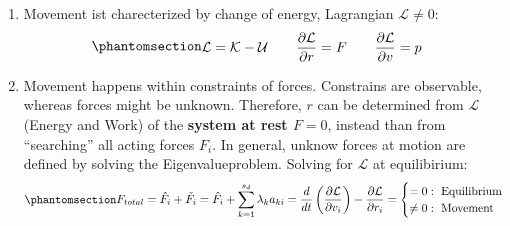 \documentclass[
  letterpaper,
  DIV=11,
  numbers=noendperiod]{scrartcl}
\begin{document}
\begin{enumerate}
\def\labelenumi{\arabic{enumi}.}
\item
  Movement ist charecterized by change of energy, Lagrangian
  \(\mathcal{L} \neq 0\):
  \begin{equation}\phantomsection\label{eq-lagrangian}{\begin{split} &
  \mathcal{L} = \mathcal{K} - \mathcal{U}
  \qquad
  \frac{\partial \mathcal{L}}{\partial r} = F
  \qquad
  \frac{\partial \mathcal{L}}{\partial v} = p
  \end{split}}\end{equation}
\item
  Movement happens within constraints of forces. Constrains are
  observable, whereas forces might be unknown. Therefore, \(r\) can be
  determined from \(\mathcal{L}\) (Energy and Work) of the
  \textbf{system at rest \(F=0\)}, instead than from ``searching'' all
  acting forces \(F_i\). In general, unknow forces at motion are defined
  by solving the Eigenvalueproblem. Solving for \textbf{\(\mathcal{L}\)}
  at equilibirium:
  \begin{equation}\phantomsection\label{eq-constrainforce}{\begin{split} &
  F_{total} = \hat{F_i} + \tilde{F_i} = \hat{F_i} + \sum_{k=1}^{s_d} \lambda_k a_{ki} = \frac{d}{dt} \left( \frac{\partial \mathcal{L}}{\partial v_i} \right) - \frac{\partial \mathcal{L}}{\partial r_i} 
  = \begin{cases}
   = 0    : \text{ Equilibrium} \\
   \neq 0 : \text{ Movement}
    \end{cases}
  \end{split}}\end{equation}


\end{enumerate}
\end{document}
